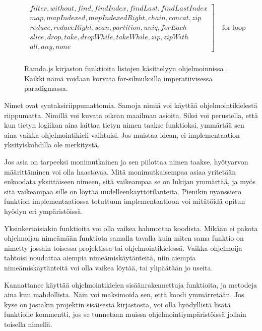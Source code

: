\begin{figure}[ht]
    \centering
    \[
        \begin{array}{rl}
            \left.
            \begin{array}{l}
                filter, without, find, findIndex, findLast, findLastIndex \\
                map, mapIndexed, mapIndexedRight, chain, concat, zip      \\
                reduce, reduceRight, scan, partition, uniq, forEach       \\
                slice, drop, take, dropWhile, takeWhile, zip, zipWith     \\
                all, any, none
            \end{array}
            \right] \quad \text{for loop}
            \\
        \end{array}
    \]
    \caption{Ramda.js kirjaston funktioita listojen käsittelyyn ohjelmoinnissa \cite{ramda:docs}. Kaikki nämä voidaan korvata for-silmukoilla imperatiivisessa paradigmassa.}
    \label{fig:ramdacmds}
\end{figure}

Nimet ovat syntaksiriippumattomia. Samoja nimiä voi käyttää ohjelmointikielestä riippumatta. Nimillä voi kuvata oikean maailman asioita. Siksi voi perustella, että kun tietyn logiikan aina laittaa tietyn nimen taakse funktioksi, ymmärtää sen aina vaikka ohjelmointikieli vaihtuisi. Jos muistaa idean, ei implementaation yksityiskohdilla ole merkitystä.

Jos asia on tarpeeksi monimutkainen ja sen piilottaa nimen taakse, hyötyarvon määrittäminen voi olla haastavaa. Mitä monimutkaisempaa asiaa yritetään enkoodata yksittäiseen nimeen, sitä vaikeampaa se on lukijan ymmärtää, ja myös sitä vaikeampaa sille on löytää uudelleenkäyttötilanteita. Pienikin nyanssiero funktion implementaatiossa totuttuun implementaatioon voi mitätöidä opitun hyödyn eri ympäristöissä.

Yksinkertaisiakin funktioita voi olla vaikea hahmottaa koodista. Mikään ei pakota ohjelmoijaa nimeämään funktiota samalla tavalla kuin miten sama funktio on nimetty jossain toisessa projektissa tai ohjelmointikielessä. Vaikka ohjelmoija tahtoisi noudattaa aiempia nimeämiskäytänteitä, niin aiempia nimeämiskäytänteitä voi olla vaikea löytää, tai ylipäätään jo useita.

Kannattanee käyttää ohjelmointikielen sisäänrakennettuja funktioita, ja metodeja aina kun mahdollista. Näin voi maksimoida sen, että koodi ymmärretään. Jos kyse on jostakin projektin sisäisestä kirjastosta, voi olla hyödyllistä lisätä funktiolle kommentti, jos se tunnetaan muissa ohjelmointiympäristöissä jollain toisella nimellä.


